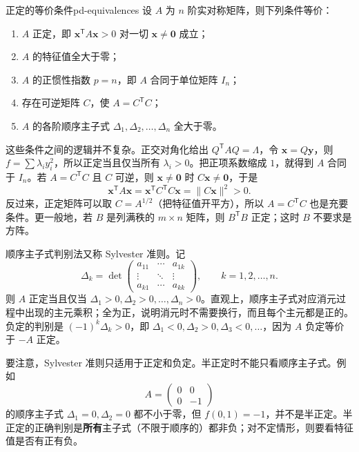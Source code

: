 \begin{conclusion}{正定的等价条件}{pd-equivalences}
设 $A$ 为 $n$ 阶实对称矩阵，则下列条件等价：
\begin{enumerate}
\item $A$ 正定，即 $\mathbf{x}^{\mathsf T}A\mathbf{x}>0$ 对一切 $\mathbf{x}\ne\mathbf{0}$ 成立；
\item $A$ 的特征值全大于零；
\item $A$ 的正惯性指数 $p=n$，即 $A$ 合同于单位矩阵 $I_n$；
\item 存在可逆矩阵 $C$，使 $A=C^{\mathsf T}C$；
\item $A$ 的各阶顺序主子式 $\Delta_1,\Delta_2,\dots,\Delta_n$ 全大于零。
\end{enumerate}
\end{conclusion}

这些条件之间的逻辑并不复杂。正交对角化给出 $Q^{\mathsf T}AQ=\Lambda$，令 $\mathbf{x}=Q\mathbf{y}$，则 $f=\sum\lambda_iy_i^2$，所以正定当且仅当所有 $\lambda_i>0$。把正项系数缩成 $1$，就得到 $A$ 合同于 $I_n$。若 $A=C^{\mathsf T}C$ 且 $C$ 可逆，则 $\mathbf{x}\ne\mathbf{0}$ 时 $C\mathbf{x}\ne\mathbf{0}$，于是
\[
\mathbf{x}^{\mathsf T}A\mathbf{x}=\mathbf{x}^{\mathsf T}C^{\mathsf T}C\mathbf{x}=\|C\mathbf{x}\|^2>0.
\]
反过来，正定矩阵可以取 $C=A^{1/2}$（把特征值开平方），所以 $A=C^{\mathsf T}C$ 也是充要条件。更一般地，若 $B$ 是列满秩的 $m\times n$ 矩阵，则 $B^{\mathsf T}B$ 正定；这时 $B$ 不要求是方阵。

顺序主子式判别法又称 Sylvester 准则。记
\[
\Delta_k=\det\begin{pmatrix}
a_{11}&\cdots&a_{1k}\\
\vdots&\ddots&\vdots\\
a_{k1}&\cdots&a_{kk}
\end{pmatrix},\qquad k=1,2,\dots,n.
\]
则 $A$ 正定当且仅当 $\Delta_1>0,\Delta_2>0,\dots,\Delta_n>0$。直观上，顺序主子式对应消元过程中出现的主元乘积；全为正，说明消元时不需要换行，而且每个主元都是正的。负定的判别是 $(-1)^k\Delta_k>0$，即 $\Delta_1<0,\Delta_2>0,\Delta_3<0,\dots$，因为 $A$ 负定等价于 $-A$ 正定。

要注意，Sylvester 准则只适用于正定和负定。半正定时不能只看顺序主子式。例如
\[
A=\begin{pmatrix}0&0\\0&-1\end{pmatrix}
\]
的顺序主子式 $\Delta_1=0,\Delta_2=0$ 都不小于零，但 $f(0,1)=-1$，并不是半正定。半正定的正确判别是\textbf{所有}主子式（不限于顺序的）都非负；对不定情形，则要看特征值是否有正有负。

